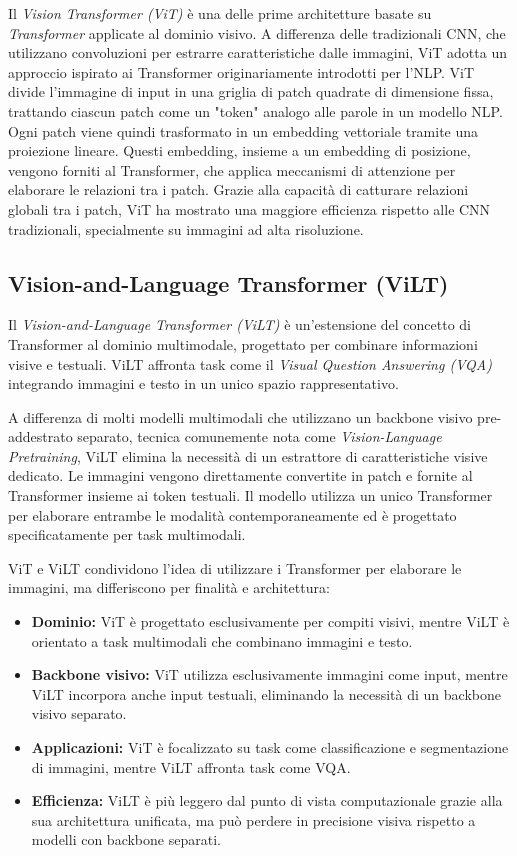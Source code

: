 \documentclass[../main.tex]{subfiles}
\begin{document}
Il \textit{Vision Transformer (ViT)} \cite{dosovitskiy2021imageworth16x16words} è una delle prime architetture basate su \textit{Transformer} applicate al dominio visivo. A differenza delle tradizionali CNN, che utilizzano convoluzioni per estrarre caratteristiche dalle immagini, ViT adotta un approccio ispirato ai Transformer originariamente introdotti per l'NLP.
ViT divide l'immagine di input in una griglia di patch quadrate di dimensione fissa, trattando ciascun patch come un "token" analogo alle parole in un modello NLP. Ogni patch viene quindi trasformato in un embedding vettoriale tramite una proiezione lineare. Questi embedding, insieme a un embedding di posizione, vengono forniti al Transformer, che applica meccanismi di attenzione per elaborare le relazioni tra i patch. 
Grazie alla capacità di catturare relazioni globali tra i patch, ViT ha mostrato una maggiore efficienza rispetto alle CNN tradizionali, specialmente su immagini ad alta risoluzione.

\subsection{Vision-and-Language Transformer (ViLT)}

Il \textit{Vision-and-Language Transformer (ViLT)} \cite{kim2021viltvisionandlanguagetransformerconvolution} è un'estensione del concetto di Transformer al dominio multimodale, progettato per combinare informazioni visive e testuali. ViLT affronta task come il \textit{Visual Question Answering (VQA)} integrando immagini e testo in un unico spazio rappresentativo.

A differenza di molti modelli multimodali che utilizzano un backbone visivo pre-addestrato separato, tecnica comunemente nota come \textit{Vision-Language Pretraining}, ViLT elimina la necessità di un estrattore di caratteristiche visive dedicato. Le immagini vengono direttamente convertite in patch e fornite al Transformer insieme ai token testuali. 
Il modello utilizza un unico Transformer per elaborare entrambe le modalità contemporaneamente ed è progettato specificatamente per task multimodali.

ViT e ViLT condividono l'idea di utilizzare i Transformer per elaborare le immagini, ma differiscono per finalità e architettura:
\begin{itemize}
    \item \textbf{Dominio:} ViT è progettato esclusivamente per compiti visivi, mentre ViLT è orientato a task multimodali che combinano immagini e testo.
    \item \textbf{Backbone visivo:} ViT utilizza esclusivamente immagini come input, mentre ViLT incorpora anche input testuali, eliminando la necessità di un backbone visivo separato.
    \item \textbf{Applicazioni:} ViT è focalizzato su task come classificazione e segmentazione di immagini, mentre ViLT affronta task come VQA.
    \item \textbf{Efficienza:} ViLT è più leggero dal punto di vista computazionale grazie alla sua architettura unificata, ma può perdere in precisione visiva rispetto a modelli con backbone separati.
\end{itemize}
\end{document}
